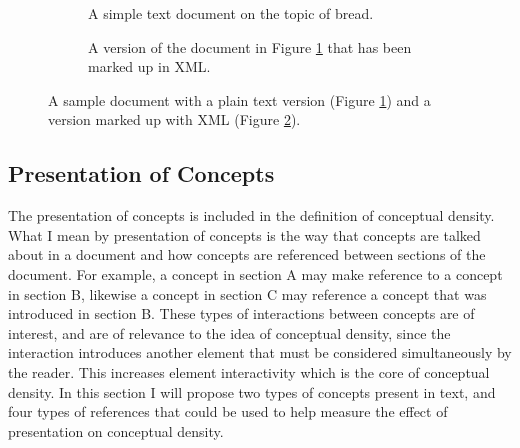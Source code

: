 \documentclass[12pt]{article}
\theoremstyle{grammarstyle}
\begin{document}
\begin{figure}
    \centering
    
    \begin{subfigure}{\linewidth}
        \lstset{breaklines=true, numbers=none, breakindent=0mm}
        
        \caption{A simple text document on the topic of bread.}
        \label{fig:sample_txt_document}
    \end{subfigure}
    
    \vspace{5mm}
    
    \begin{subfigure}{\linewidth}
        \centering
        
        \caption{A version of the document in Figure \ref{fig:sample_txt_document} that has been marked up in XML.}
        \label{fig:sample_xml_document}
    \end{subfigure}
    
    \caption{A sample document with a plain text version (Figure \ref{fig:sample_txt_document}) and a version marked up with XML (Figure \ref{fig:sample_xml_document}).}
    \label{fig:sample document}
\end{figure}

\subsection{Presentation of Concepts} \label{sec:presentation of concepts}
The presentation of concepts is included in the definition of conceptual density. What I mean by presentation of concepts is the way that concepts are talked about in a document and how concepts are referenced between sections of the document. For example, a concept in section A may make reference to a concept in section B, likewise a concept in section C may reference a concept that was introduced in section B. These types of interactions between concepts are of interest, and are of relevance to the idea of conceptual density, since the interaction introduces another element that must be considered simultaneously by the reader. This increases element interactivity which is the core of conceptual density. In this section I will propose two types of concepts present in text, and four types of references that could be used to help measure the effect of presentation on conceptual density.
\end{document}

